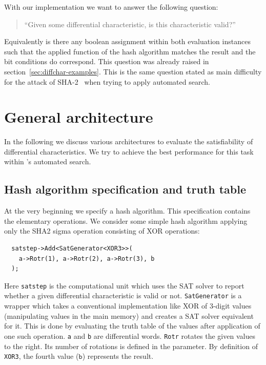 With our implementation we want to answer the following question:
\begin{quote}
  ``Given some differential characteristic, is this characteristic valid?''
\end{quote}
Equivalently is there any boolean assignment within both evaluation instances such that the applied function of the hash algorithm matches the result and the bit conditions do correspond. This question was already raised in section~\ref{sec:diffchar-examples}. This is the same question stated as main difficulty for the attack of SHA-2~\cite[293]{Cry07} when trying to apply automated search.

\section{General architecture}
\label{sec:architecture}
%
In the following we discuss various architectures to evaluate the satisfiability of differential characteristics. We try to achieve the best performance for this task within \nltool{}'s automated search.

\subsection{Hash algorithm specification and truth table}
%
At the very beginning we specify a hash algorithm. This specification contains the elementary operations. We consider some simple hash algorithm applying only the SHA2 sigma operation consisting of XOR operations:
\begin{lstlisting}
  satstep->Add<SatGenerator<XOR3>>(
    a->Rotr(1), a->Rotr(2), a->Rotr(3), b
  );
\end{lstlisting}

Here \texttt{satstep} is the computational unit which uses the SAT solver to report whether a given differential characteristic is valid or not. \texttt{SatGenerator} is a wrapper which takes a conventional implementation like XOR of 3-digit values (manipulating values in the main memory) and creates a SAT solver equivalent for it. This is done by evaluating the truth table of the values after application of one such operation. \texttt{a} and \texttt{b} are differential words. \texttt{Rotr} rotates the given values to the right. Its number of rotations is defined in the parameter. By definition of \texttt{XOR3}, the fourth value ($\texttt{b}$) represents the result.

